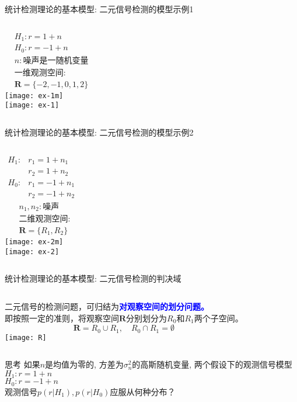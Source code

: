 \begin{frame}{统计检测理论的基本模型: 二元信号检测的模型示例1}
\begin{columns}
	\begin{align*}
	&H_1: r=1+n\\
	&H_0: r=-1+n\\
	&n:\text{噪声是一随机变量}\\
	&\text{一维观测空间:}\\
	&\bm{R}=\{-2,-1,0,1,2\}
	\end{align*}
	\texttt{[image: ex-1m]}\\
	\texttt{[image: ex-1]}
\end{columns}
\end{frame}

\begin{frame}{统计检测理论的基本模型: 二元信号检测的模型示例2}
\begin{columns}
	\begin{align*}
	H_1: &r_1=1+n_1\\
	&r_2=1+n_2\\
	H_0: &r_1=-1+n_1\\
	&r_2=-1+n_2
	\end{align*}
	\begin{align*}
	&n_1,n_2:\text{噪声}\\
	&\text{二维观测空间:}\\
	&\bm{R}=\{R_1,R_2\}
	\end{align*}
	\texttt{[image: ex-2m]}\\
	\texttt{[image: ex-2]}
\end{columns}
\end{frame}

\begin{frame}{统计检测理论的基本模型: 二元信号检测的判决域}
\begin{columns}
	二元信号的检测问题，可归结为\textcolor{blue}{\textbf{对观察空间的划分问题。}}\\
	即按照一定的准则，将观察空间$\bm{R}$分别划分为$R_0$和$R_1$两个子空间。\\
	\[\bm{R}=R_0\cup R_1,\quad R_0\cap R_1=\emptyset \]
	\texttt{[image: R]}\\
\end{columns}
\end{frame}

\begin{frame}
\begin{block}{思考}
	如果$n$是均值为零的, 方差为$\sigma_n^2$的高斯随机变量, 两个假设下的观测信号模型\\
	$H_1: r=1+n$\\
	$H_0: r=-1+n$\\
	观测信号$p(r|H_1),p(r|H_0)$应服从何种分布？
\end{block}
\end{frame}

